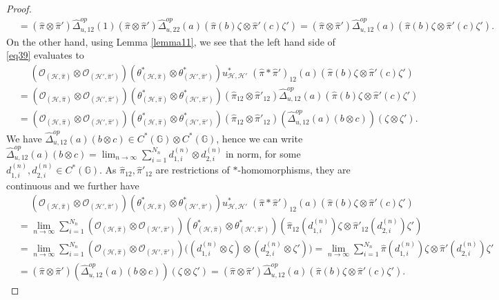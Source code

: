 \documentclass[reqno]{amsart}
\numberwithin{equation}{section}
\newcommand{\mc}{\mathcal}
\newcommand{\GG}{\mathbb{G}}
\begin{document}
\begin{proof}
\begin{equation}
\begin{split}
&=(\hat{\pi}\otimes\hat{\pi}')\hat{\Delta}_{u,12}^{op} (1)
(\hat{\pi}\otimes \hat{\pi}')\hat{\Delta}^{op}_{u,22}(a)
(\hat{\pi}(b)\zeta \otimes \hat{\pi}'(c) \zeta')=
(\hat{\pi}\otimes\hat{\pi}')\hat{\Delta}_{u,12}^{op} (a)
(\hat{\pi}(b)\zeta \otimes \hat{\pi}'(c) \zeta').
\end{split}
\end{equation}
On the other hand, using Lemma \ref{lemma11}, we see that the left hand side of \eqref{eq39} evaluates to
\[\begin{split}
&\quad\;
(\mc{O}_{(\mc{H},\hat{\pi})}
\otimes \mc{O}_{(\mc{H}',\hat{\pi}')})
( \theta_{(\mc{H},\hat{\pi})}^*\otimes \theta_{(\mc{H}',\hat{\pi}')}^*) u_{\mc{H},\mc{H}'}^*  \;
(\hat{\pi}\ast\hat{\pi}')_{12}(a) (\hat{\pi}(b)\zeta \otimes \hat{\pi}'(c) \zeta')\\
&=
(\mc{O}_{(\mc{H},\hat{\pi})}
\otimes \mc{O}_{(\mc{H}',\hat{\pi}')})
( \theta_{(\mc{H},\hat{\pi})}^*\otimes \theta_{(\mc{H}',\hat{\pi}')}^*)
(\hat{\pi}_{12}\otimes \hat{\pi}'_{12})\hat{\Delta}^{op}_{u,12}(a) (\hat{\pi}(b)\zeta \otimes \hat{\pi}'(c) \zeta')\\
&=
(\mc{O}_{(\mc{H},\hat{\pi})}\otimes \mc{O}_{(\mc{H}',\hat{\pi}')})
( \theta_{(\mc{H},\hat{\pi})}^*\otimes \theta_{(\mc{H}',\hat{\pi}')}^*)
(\hat{\pi}_{12}\otimes \hat{\pi}'_{12})(
\hat{\Delta}^{op}_{u,12}(a) (b\otimes c))(
\zeta \otimes  \zeta').
\end{split}\]
We have $\hat{\Delta}^{op}_{u,12}(a) (b\otimes c)\in C^*(\GG)\otimes C^*(\GG)$, hence we can write $\hat{\Delta}^{op}_{u,12}(a) (b\otimes c)=\lim_{n\to\infty}\sum_{i=1}^{N_n} d^{(n)}_{1,i}\otimes d^{(n)}_{2,i}$ in norm, for some $d^{(n)}_{1,i},d^{(n)}_{2,i}\in C^*(\GG)$. As $\hat{\pi}_{12},\hat{\pi}'_{12}$ are restrictions of $*$-homomorphisms, they are continuous and we further have
\begin{equation}\begin{split}\label{eq41}
&\quad\;
(\mc{O}_{(\mc{H},\hat{\pi})}\otimes \mc{O}_{(\mc{H}',\hat{\pi}')})
( \theta_{(\mc{H},\hat{\pi})}^*\otimes \theta_{(\mc{H}',\hat{\pi}')}^*) u_{\mc{H},\mc{H}'}^*  \;
(\hat{\pi}\ast\hat{\pi}')_{12}(a) (\hat{\pi}(b)\zeta \otimes \hat{\pi}'(c) \zeta')\\
&=
\lim_{n\to\infty}\sum_{i=1}^{N_n}
(\mc{O}_{(\mc{H},\hat{\pi})}\otimes \mc{O}_{(\mc{H}',\hat{\pi}')})
( \theta_{(\mc{H},\hat{\pi})}^*\otimes \theta_{(\mc{H}',\hat{\pi}')}^*)  
(\hat{\pi}_{12}(d^{(n)}_{1,i})\zeta \otimes  \hat{\pi}'_{12}(d^{(n)}_{2,i})\zeta')\\
&=
\lim_{n\to\infty}\sum_{i=1}^{N_n}
(\mc{O}_{(\mc{H},\hat{\pi})}\otimes \mc{O}_{(\mc{H}',\hat{\pi}')})
\bigl(
(d^{(n)}_{1,i}\otimes \zeta) \otimes
(d^{(n)}_{2,i}\otimes \zeta')\bigr)=
\lim_{n\to\infty}\sum_{i=1}^{N_n}
\hat{\pi}(d^{(n)}_{1,i})\zeta \otimes
\hat{\pi}'(d^{(n)}_{2,i})\zeta'\\
&=
(\hat{\pi}\otimes\hat{\pi}')(\hat{\Delta}^{op}_{u,12}(a) (b\otimes c))(\zeta\otimes \zeta')=
(\hat{\pi}\otimes\hat{\pi}')\hat{\Delta}^{op}_{u,12}(a)
 (\hat{\pi}(b)\zeta\otimes \hat{\pi}'(c)\zeta').
\end{split}\end{equation}


\end{proof}
\end{document}

